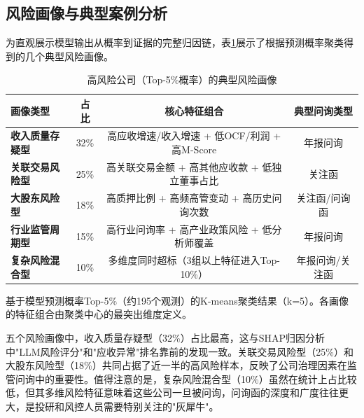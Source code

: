 \subsection{风险画像与典型案例分析}

为直观展示模型输出从概率到证据的完整归因链，表\ref{tab:profile}展示了根据预测概率聚类得到的几个典型风险画像。

\begin{table}[H]
\centering
\caption{高风险公司（Top-5\%概率）的典型风险画像}
\label{tab:profile}
\begin{threeparttable}
\small
\begin{tabular}{lccc}
\toprule
画像类型 & 占比 & 核心特征组合 & 典型问询类型 \\
\midrule
\textbf{收入质量存疑型} & 32\% & 高应收增速/收入增速 + 低OCF/利润 + 高M-Score & 年报问询 \\
\textbf{关联交易风险型} & 25\% & 高关联交易金额 + 高其他应收款 + 低独立董事占比 & 关注函 \\
\textbf{大股东风险型} & 18\% & 高质押比例 + 高频高管变动 + 高历史问询次数 & 关注函/问询函 \\
\textbf{行业监管周期型} & 15\% & 高行业问询率 + 高产业政策风险 + 低分析师覆盖 & 年报问询 \\
\textbf{复杂风险混合型} & 10\% & 多维度同时超标（3组以上特征进入Top-10\%） & 年报问询/关注函 \\
\bottomrule
\end{tabular}
\begin{tablenotes}
\item[注] 基于模型预测概率Top-5\%（约195个观测）的K-means聚类结果（k=5）。各画像的特征组合由聚类中心的最突出维度定义。
\end{tablenotes}
\end{threeparttable}
\end{table}

五个风险画像中，收入质量存疑型（32\%）占比最高，这与SHAP归因分析中"LLM风险评分"和"应收异常"排名靠前的发现一致。关联交易风险型（25\%）和大股东风险型（18\%）共同占据了近一半的高风险样本，反映了公司治理因素在监管问询中的重要性。值得注意的是，复杂风险混合型（10\%）虽然在统计上占比较低，但其多维风险特征意味着这些公司一旦被问询，问询函的深度和广度往往更大，是投研和风控人员需要特别关注的"灰犀牛"。